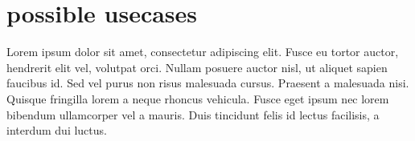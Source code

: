 \chapter{possible usecases}
\label{chap:possible_extensions_usecases}
Lorem ipsum dolor sit amet, consectetur adipiscing elit. Fusce eu tortor auctor,
hendrerit elit vel, volutpat orci. Nullam posuere auctor nisl, ut aliquet sapien
faucibus id. Sed vel purus non risus malesuada cursus. Praesent a malesuada
nisi. Quisque fringilla lorem a neque rhoncus vehicula. Fusce eget ipsum nec
lorem bibendum ullamcorper vel a mauris. Duis tincidunt felis id lectus
facilisis, a interdum dui luctus.